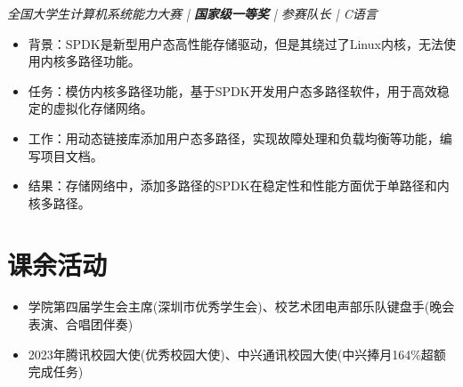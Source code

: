 \documentclass{resume}
\begin{document}
\textit{全国大学生计算机系统能力大赛 | \textbf{国家级一等奖} | 参赛队长 | C语言}
\begin{itemize}
  \item 背景：SPDK是新型用户态高性能存储驱动，但是其绕过了Linux内核，无法使用内核多路径功能。
  \item 任务：模仿内核多路径功能，基于SPDK开发用户态多路径软件，用于高效稳定的虚拟化存储网络。
  \item 工作：用动态链接库添加用户态多路径，实现故障处理和负载均衡等功能，编写项目文档。
  \item 结果：存储网络中，添加多路径的SPDK在稳定性和性能方面优于单路径和内核多路径。
\end{itemize}

\section{课余活动}
\begin{itemize}[parsep=0.2ex]
  \item 学院第四届学生会主席(深圳市优秀学生会)、校艺术团电声部乐队键盘手(晚会表演、合唱团伴奏)
  \item 2023年腾讯校园大使(优秀校园大使)、中兴通讯校园大使(中兴捧月164\%超额完成任务)
\end{itemize}
\end{document}
